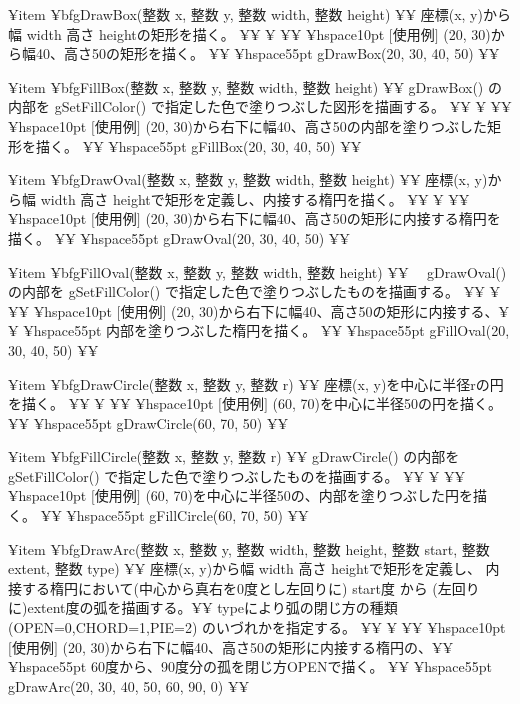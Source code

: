 ¥item {¥bf{gDrawBox(整数 x, 整数 y, 整数 width, 整数 height)}} ¥¥
       座標(x, y)から幅 width 高さ heightの矩形を描く。 ¥¥
¥ ¥¥
	 ¥hspace{10pt}  $[$使用例$]$ (20, 30)から幅40、高さ50の矩形を描く。 ¥¥
         ¥hspace{55pt}      gDrawBox(20, 30, 40, 50) ¥¥

¥item {¥bf{gFillBox(整数 x, 整数 y, 整数 width, 整数 height)}} ¥¥
       gDrawBox() の内部を gSetFillColor() で指定した色で塗りつぶした図形を描画する。 ¥¥
¥ ¥¥
	 ¥hspace{10pt}  $[$使用例$]$ (20, 30)から右下に幅40、高さ50の内部を塗りつぶした矩形を描く。 ¥¥
         ¥hspace{55pt}      gFillBox(20, 30, 40, 50) ¥¥

¥item {¥bf{gDrawOval(整数 x, 整数 y, 整数 width, 整数 height)}} ¥¥
       座標(x, y)から幅 width 高さ heightで矩形を定義し、内接する楕円を描く。 ¥¥
¥ ¥¥
	 ¥hspace{10pt}  $[$使用例$]$ (20, 30)から右下に幅40、高さ50の矩形に内接する楕円を描く。 ¥¥
         ¥hspace{55pt}      gDrawOval(20, 30, 40, 50) ¥¥

¥item {¥bf{gFillOval(整数 x, 整数 y, 整数 width, 整数 height)}} ¥¥
      　gDrawOval() の内部を gSetFillColor() で指定した色で塗りつぶしたものを描画する。 ¥¥
¥ ¥¥
	 ¥hspace{10pt}  $[$使用例$]$ (20, 30)から右下に幅40、高さ50の矩形に内接する、¥¥
         ¥hspace{55pt}  内部を塗りつぶした楕円を描く。 ¥¥
         ¥hspace{55pt}      gFillOval(20, 30, 40, 50) ¥¥

¥item {¥bf{gDrawCircle(整数 x, 整数 y, 整数 r)}} ¥¥
       座標(x, y)を中心に半径rの円を描く。 ¥¥
¥ ¥¥
	 ¥hspace{10pt}  $[$使用例$]$  (60, 70)を中心に半径50の円を描く。 ¥¥
         ¥hspace{55pt}      gDrawCircle(60, 70, 50) ¥¥

¥item {¥bf{gFillCircle(整数 x, 整数 y, 整数 r)}} ¥¥
       gDrawCircle() の内部を gSetFillColor() で指定した色で塗りつぶしたものを描画する。 ¥¥
¥ ¥¥
	 ¥hspace{10pt}  $[$使用例$]$ (60, 70)を中心に半径50の、内部を塗りつぶした円を描く。 ¥¥
         ¥hspace{55pt}      gFillCircle(60, 70, 50) ¥¥

¥item {¥bf{gDrawArc(整数 x, 整数 y, 整数 width, 整数 height, 整数 start, 整数 extent, 整数 type)}} ¥¥
       座標(x, y)から幅 width 高さ heightで矩形を定義し、
       内接する楕円において(中心から真右を0度とし左回りに) 
       start度 から (左回りに)extent度の弧を描画する。¥¥
       typeにより弧の閉じ方の種類 (OPEN=0,CHORD=1,PIE=2)
       のいづれかを指定する。 ¥¥
¥ ¥¥
	 ¥hspace{10pt}  $[$使用例$]$ (20, 30)から右下に幅40、高さ50の矩形に内接する楕円の、¥¥
         ¥hspace{55pt}  60度から、90度分の孤を閉じ方OPENで描く。 ¥¥
         ¥hspace{55pt}     gDrawArc(20, 30, 40, 50, 60, 90, 0) ¥¥


